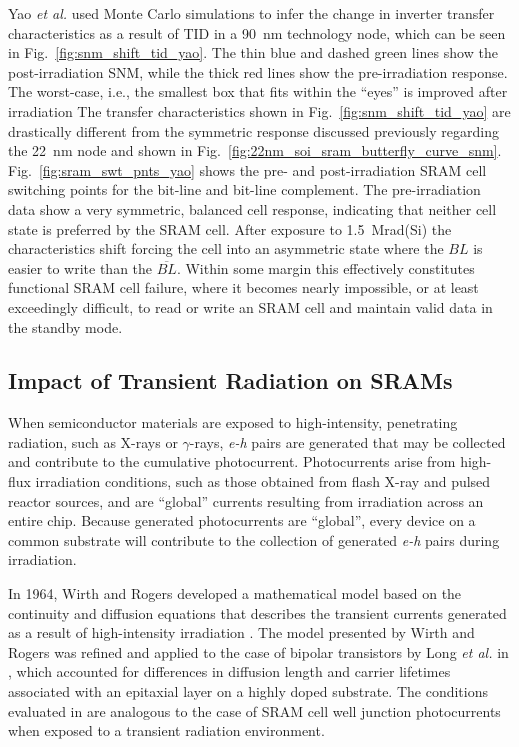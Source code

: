 Yao \emph{et al.} used Monte Carlo simulations to infer the change in inverter transfer characteristics as a result of TID in a 90~nm technology node, which can be seen in Fig.~\ref{fig:snm_shift_tid_yao}.
The thin blue and dashed green lines show the post-irradiation SNM, while the thick red lines show the pre-irradiation response. The worst-case, i.e., the smallest box that fits within the ``eyes'' is improved after irradiation
The transfer characteristics shown in Fig.~\ref{fig:snm_shift_tid_yao} are drastically different from the symmetric response discussed previously regarding the 22~nm node and shown in Fig.~\ref{fig:22nm_soi_sram_butterfly_curve_snm}. 
Fig.~\ref{fig:sram_swt_pnts_yao} shows the pre- and post-irradiation SRAM cell switching points for the bit-line and bit-line complement.
The pre-irradiation data show a very symmetric, balanced cell response, indicating that neither cell state is preferred by the SRAM cell.
After exposure to 1.5~Mrad(Si) the characteristics shift forcing the cell into an asymmetric state where the $BL$ is easier to write than the $\overline{BL}$.
Within some margin this effectively constitutes functional SRAM cell failure, where it becomes nearly impossible, or at least exceedingly difficult, to read or write an SRAM cell and maintain valid data in the standby mode.


\subsection{Impact of Transient Radiation on SRAMs} %
\label{sub:railspan_collapse}
When semiconductor materials are exposed to high-intensity, penetrating radiation, such as X-rays or $\gamma$-rays, \emph{e-h} pairs are generated that may be collected and contribute to the cumulative photocurrent.
Photocurrents arise from high-flux irradiation conditions, such as those obtained from flash X-ray and pulsed reactor sources, and are ``global'' currents resulting from irradiation across an entire chip.
Because generated photocurrents are ``global'', every device on a common substrate will contribute to the collection of generated \emph{e-h} pairs during irradiation.

In 1964, Wirth and Rogers developed a mathematical model based on the continuity and diffusion equations that describes the transient currents generated as a result of high-intensity irradiation \cite{Wirth:1964kp}.
The model presented by Wirth and Rogers was refined and applied to the case of bipolar transistors by Long \emph{et al.} in \cite{Long:1983fg}, which accounted for differences in diffusion length and carrier lifetimes associated with an epitaxial layer on a highly doped substrate.
The conditions evaluated in \cite{Long:1983fg} are analogous to the case of  SRAM cell well junction photocurrents when exposed to a transient radiation environment.


